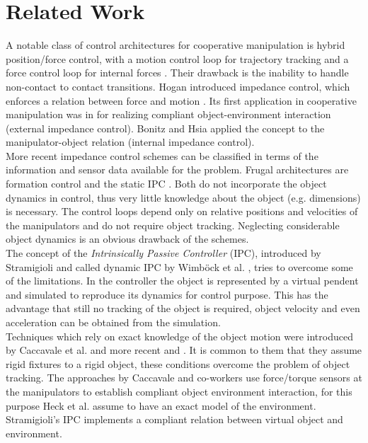 \documentclass[a4paper,twoside, openright,12pt]{report}
\begin{document}
\section{Related Work}
A notable class of control architectures for cooperative manipulation is hybrid position/force control, with a motion control loop for trajectory tracking and a force control loop for internal forces \cite{Wen_92,Hsu_93}. Their drawback is the inability to handle non-contact to contact transitions. Hogan introduced impedance control, which enforces a relation between force and motion \cite{Hogan_84}. Its first application in cooperative manipulation was in \cite{Schneider_92} for realizing compliant object-environment interaction (external impedance control). Bonitz and Hsia \cite{Bonitz_96} applied the concept to the manipulator-object relation (internal impedance control).\\
More recent impedance control schemes can be classified in terms of the information and sensor data available for the problem. Frugal architectures are formation control \cite{Sieber_15} and the static IPC \cite{Wimboeck_06}. Both do not incorporate the object dynamics in control, thus very little knowledge about the object (e.g. dimensions) is necessary. The control loops depend only on relative positions and velocities of the manipulators and do not require object tracking. Neglecting considerable object dynamics is an obvious drawback of the schemes.\\
The concept of the \emph{Intrinsically Passive Controller} (IPC), introduced by Stramigioli \cite{Stramigioli_01} and called dynamic IPC by Wimb\"ock et al. \cite{Wimboeck_08}, tries to overcome some of the limitations. In the controller the object is represented by a virtual pendent and simulated to reproduce its dynamics for control purpose. This has the advantage that still no tracking of the object is required, object velocity and even acceleration can be obtained from the simulation. \\
Techniques which rely on exact knowledge of the object motion were introduced by Caccavale et al. \cite{Caccavale_01,Caccavale_08} and more recent \cite{Heck_13} and \cite{DePascali_15}. It is common to them that they assume rigid fixtures to a rigid object, these conditions overcome the problem of object tracking. The approaches by Caccavale and co-workers use force/torque sensors at the manipulators to establish compliant object environment interaction, for this purpose Heck et al. \cite{Heck_13} assume to have an exact model of the environment. Stramigioli's IPC implements a compliant relation between virtual object and environment. \\
\end{document}
